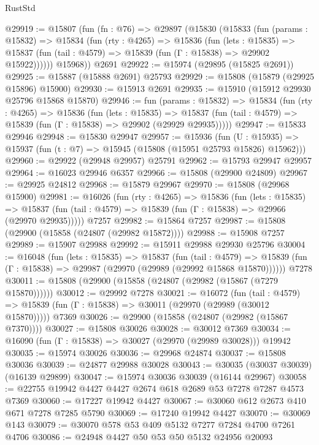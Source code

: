 \begin{lexlean}{RustStd}
\begin{coremodule}
@29919 := @15807
    (fun (fn : @76) =>
    @29897
      (@15830
        (@15833
          (fun (params : @15832) =>
          @15834
            (fun (rty : @4265) =>
            @15836
              (fun (lets : @15835) =>
              @15837 (fun (tail : @4579) => @15839 (fun (Γ : @15838) => @29902 @15922))))))
        @15968))
    @2691
@29922 := @15974 (@29895 (@15825 @2691))
@29925 := @15887 (@15888 @2691) @25793
@29929 := @15808 (@15879 (@29925 @15896) @15900)
@29930 := @15913 @2691
@29935 := @15910 (@15912 @29930 @25796 @15868 @15870)
@29946 := fun (params : @15832) =>
  @15834
    (fun (rty : @4265) =>
    @15836
      (fun (lets : @15835) =>
      @15837 (fun (tail : @4579) => @15839 (fun (Γ : @15838) => @29902 (@29929 @29935)))))
@29947 := @15833 @29946
@29948 := @15830 @29947
@29957 := @15936
    (fun (U : @15935) => @15937 (fun (t : @7) => @15945 (@15808 (@15951 @25793 @15826) @15962)))
@29960 := @29922 (@29948 @29957) @25791
@29962 := @15793 @29947 @29957
@29964 := @16023 @29946 @6357
@29966 := @15808 (@29900 @24809)
@29967 := @29925 @24812
@29968 := @15879 @29967
@29970 := @15808 (@29968 @15900)
@29981 := @16026
    (fun (rty : @4265) =>
    @15836
      (fun (lets : @15835) =>
      @15837 (fun (tail : @4579) => @15839 (fun (Γ : @15838) => @29966 (@29970 @29935)))))
    @7257
@29982 := @15864 @7257
@29987 := @15808 (@29900 (@15858 (@24807 (@29982 @15872))))
@29988 := @15908 @7257
@29989 := @15907 @29988
@29992 := @15911 @29988 @29930 @25796
@30004 := @16048
    (fun (lets : @15835) =>
    @15837
      (fun (tail : @4579) =>
      @15839 (fun (Γ : @15838) => @29987 (@29970 (@29989 (@29992 @15868 @15870))))))
    @7278
@30011 := @15808 (@29900 (@15858 (@24807 (@29982 (@15867 (@7279 @15870))))))
@30012 := @29992 @7278
@30021 := @16072
    (fun (tail : @4579) => @15839 (fun (Γ : @15838) => @30011 (@29970 (@29989 (@30012 @15870)))))
    @7369
@30026 := @29900 (@15858 (@24807 (@29982 (@15867 @7370))))
@30027 := @15808 @30026
@30028 := @30012 @7369
@30034 := @16090 (fun (Γ : @15838) => @30027 (@29970 (@29989 @30028))) @19942
@30035 := @15974 @30026
@30036 := @29968 @24874
@30037 := @15808 @30036
@30039 := @24877 @29988 @30028
@30043 := @30035 (@30037 @30039) (@16139 @29899)
@30047 := @15974 @30036 @30039 (@16144 @29967)
@30058 := @22755 @19942 @4427 @4427 @2674 @618 @2689 @53 @7278 @7287 @4573 @7369
@30060 := @17227 @19942 @4427
@30067 := @30060 @612 @2673 @410 @671 @7278 @7285 @5790
@30069 := @17240 @19942 @4427
@30070 := @30069 @143
@30079 := @30070 @578 @53 @409 @5132 @7277 @7284 @4700 @7261 @4706
@30086 := @24948 @4427 @50 @53 @50 @5132 @24956 @20093

\end{coremodule}
\end{lexlean}
